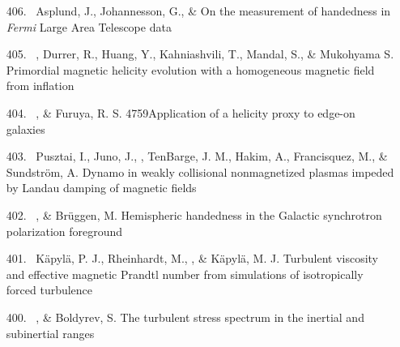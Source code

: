 \begin{itemize}
\item[{406.}~]
Asplund, J., Johannesson, G., \& \Brandenburg{}
{On the measurement of handedness in {\em Fermi} Large Area Telescope data}

\item[{405.}~]
\Brandenburg, Durrer, R., Huang, Y., Kahniashvili, T., Mandal, S., \& Mukohyama S.
{Primordial magnetic helicity evolution with a homogeneous magnetic field from inflation}

\item[{404.}~]
\Brandenburg, \& Furuya, R. S.
{4759}{Application of a helicity proxy to edge-on galaxies}

\item[{403.}~]
Pusztai, I., Juno, J., \Brandenburg, TenBarge, J. M., Hakim, A., Francisquez, M., \& Sundstr\"{o}m, A.
{Dynamo in weakly collisional nonmagnetized plasmas impeded by Landau damping of magnetic fields}

\item[{402.}~]
\Brandenburg, \& Br\"uggen, M.
{Hemispheric handedness in the Galactic synchrotron polarization foreground}

\item[{401.}~]
K\"apyl\"a, P. J., Rheinhardt, M., \Brandenburg, \& K\"apyl\"a, M. J.
{Turbulent viscosity and effective magnetic Prandtl number from simulations of isotropically forced turbulence}

\item[{400.}~]
\Brandenburg, \& Boldyrev, S.
{The turbulent stress spectrum in the inertial and subinertial ranges}


\end{itemize}
